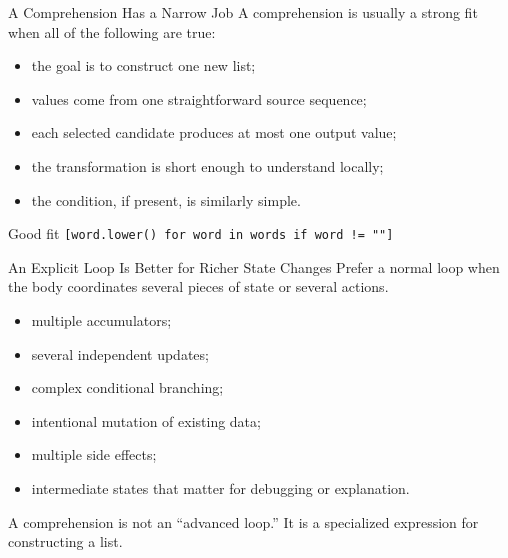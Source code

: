 \documentclass[aspectratio=169,10pt]{beamer}
\begin{document}

\begin{frame}{A Comprehension Has a Narrow Job}
  A comprehension is usually a strong fit when all of the following are true:
  \begin{itemize}
    \item the goal is to construct one new list;
    \item values come from one straightforward source sequence;
    \item each selected candidate produces at most one output value;
    \item the transformation is short enough to understand locally;
    \item the condition, if present, is similarly simple.
  \end{itemize}

  \begin{block}{Good fit}
    \centering
    \texttt{[word.lower() for word in words if word != ""]}
  \end{block}
\end{frame}

\begin{frame}{An Explicit Loop Is Better for Richer State Changes}
  Prefer a normal loop when the body coordinates several pieces of state or several actions.

  \begin{itemize}
    \item multiple accumulators;
    \item several independent updates;
    \item complex conditional branching;
    \item intentional mutation of existing data;
    \item multiple side effects;
    \item intermediate states that matter for debugging or explanation.
  \end{itemize}

  \begin{keyidea}
    A comprehension is not an ``advanced loop.'' It is a specialized expression for constructing a list.
  \end{keyidea}
\end{frame}
\end{document}
